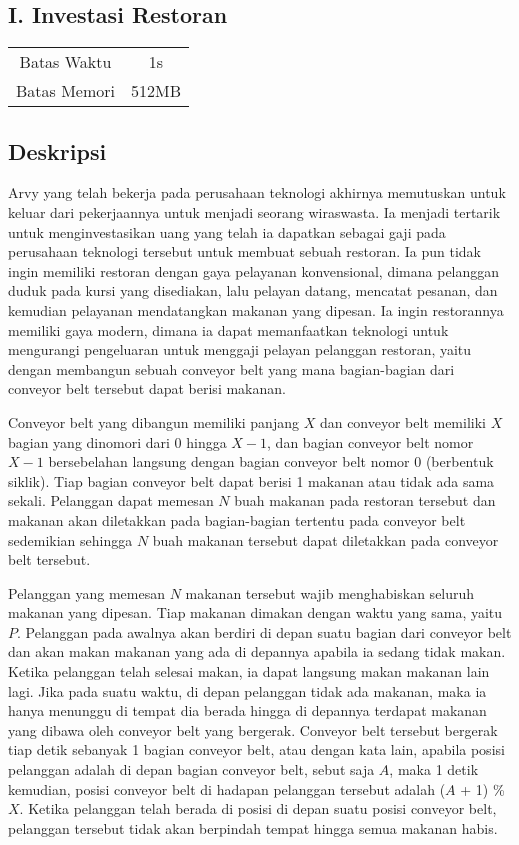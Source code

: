 \documentclass{article}
\begin{document}
\begin{center}
    \section*{I. Investasi Restoran}

    \begin{tabular}{ | c c | }
        \hline
        Batas Waktu  & 1s \\
        Batas Memori & 512MB \\ 
        \hline
    \end{tabular}
\end{center}

\subsection*{Deskripsi}

Arvy yang telah bekerja pada perusahaan teknologi akhirnya memutuskan untuk keluar dari pekerjaannya untuk menjadi seorang wiraswasta. Ia menjadi tertarik untuk menginvestasikan uang yang telah ia dapatkan sebagai gaji pada perusahaan teknologi tersebut untuk membuat sebuah restoran. Ia pun tidak ingin memiliki restoran dengan gaya pelayanan konvensional, dimana pelanggan duduk pada kursi yang disediakan, lalu pelayan datang, mencatat pesanan, dan kemudian pelayanan mendatangkan makanan yang dipesan. Ia ingin restorannya memiliki gaya modern, dimana ia dapat memanfaatkan teknologi untuk mengurangi pengeluaran untuk menggaji pelayan pelanggan restoran, yaitu dengan membangun sebuah conveyor belt yang mana bagian-bagian dari conveyor belt tersebut dapat berisi makanan.

Conveyor belt yang dibangun memiliki panjang $X$ dan conveyor belt memiliki $X$ bagian yang dinomori dari 0 hingga $X-1$, dan bagian conveyor belt nomor $X-1$ bersebelahan langsung dengan bagian conveyor belt nomor 0 (berbentuk siklik). Tiap bagian conveyor belt dapat berisi 1 makanan atau tidak ada sama sekali. Pelanggan dapat memesan $N$ buah makanan pada restoran tersebut dan makanan akan diletakkan pada bagian-bagian tertentu pada conveyor belt sedemikian sehingga $N$ buah makanan tersebut dapat diletakkan pada conveyor belt tersebut. 

Pelanggan yang memesan $N$ makanan tersebut wajib menghabiskan seluruh makanan yang dipesan. Tiap makanan dimakan dengan waktu yang sama, yaitu $P$. Pelanggan pada awalnya akan berdiri di depan suatu bagian dari conveyor belt dan akan makan makanan yang ada di depannya apabila ia sedang tidak makan. Ketika pelanggan telah selesai makan, ia dapat langsung makan makanan lain lagi. Jika pada suatu waktu, di depan pelanggan tidak ada makanan, maka ia hanya menunggu di tempat dia berada hingga di depannya terdapat makanan yang dibawa oleh conveyor belt yang bergerak. Conveyor belt tersebut bergerak tiap detik sebanyak 1 bagian conveyor belt, atau dengan kata lain, apabila posisi pelanggan adalah di depan bagian conveyor belt, sebut saja $A$, maka 1 detik kemudian, posisi conveyor belt di hadapan pelanggan tersebut adalah ($A$ + 1) \% $X$. Ketika pelanggan telah berada di posisi di depan suatu posisi conveyor belt, pelanggan tersebut tidak akan berpindah tempat hingga semua makanan habis. 
\end{document}
